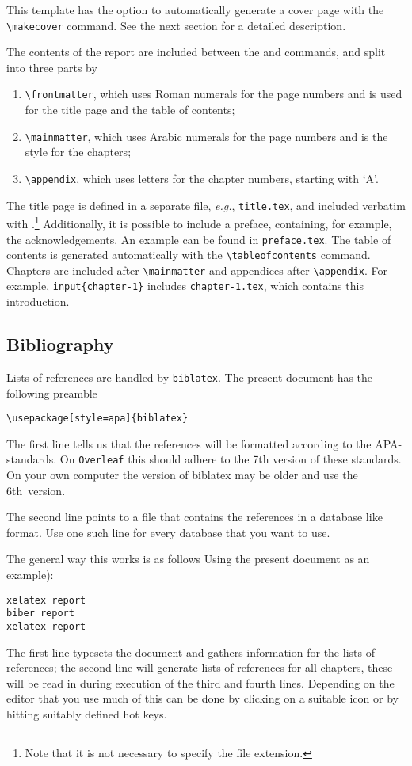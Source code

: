 This template has the option to automatically generate a cover page with the \verb|\makecover| command. See the next section for a detailed description.

The contents of the report are included between the \verb|| and \verb|| commands, and split into three parts by
\begin{enumerate}
\item\verb|\frontmatter|, which uses Roman numerals for the page numbers and is used for the title page and the table of contents;
\item\verb|\mainmatter|, which uses Arabic numerals for the page numbers and is the style for the chapters;
\item\verb|\appendix|, which uses letters for the chapter numbers, starting with `A'.
\end{enumerate}
The title page is defined in a separate file, \emph{e.g.}, \texttt{title.tex}, and included verbatim with \verb||.\footnote{Note that it is not necessary to specify the file extension.} Additionally, it is possible to include a preface, containing, for example, the acknowledgements. An example can be found in \texttt{preface.tex}. The table of contents is generated automatically with the \verb|\tableofcontents| command. Chapters are included after \verb|\mainmatter| and appendices after \verb|\appendix|. For example, \verb|input{chapter-1}| includes \texttt{chapter-1.tex}, which contains this introduction.

\subsection{Bibliography}

Lists of references are handled by \texttt{biblatex}.
The present document has the following preamble
\begin{verbatim}
\usepackage[style=apa]{biblatex}

\end{verbatim}
The first line tells us that the references will be formatted according 
to the APA-standards.
On \texttt{Overleaf} this should adhere to the 7th version of these 
standards.
On your own computer the version of biblatex may be older and 
use the 6th~version.

The second line points to a file that contains the references in a database
like format.
Use one such line for every database that you want to use.

The general way this works is as follows Using the present document as 
an example):
\begin{verbatim}
xelatex report
biber report
xelatex report
\end{verbatim}
The first line typesets the document and gathers information for the lists
of references; the second line will generate lists of references for all 
chapters, these will be read in during execution of the third and fourth lines.
Depending on the editor that you use much of this can be done by clicking
on a suitable icon or by hitting suitably defined hot keys.

